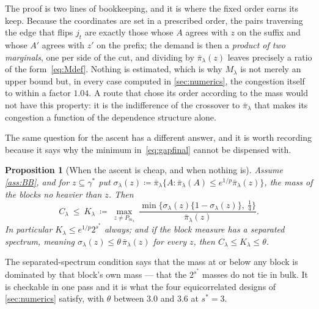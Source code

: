 \documentclass[aos]{imsart}
\theoremstyle{plain}
\newtheorem{proposition}{Proposition}[section]
\theoremstyle{definition}
\begin{document}
    The proof is two lines of bookkeeping, and it is where the fixed order
    earns its keep. Because the coordinates are set in a prescribed order,
    the pairs traversing the edge that flips $j_t$ are exactly those whose
    $A$ agrees with $z$ on the suffix and whose $A'$ agrees with $z'$ on the
    prefix; the demand is then a \emph{product of two marginals}, one per
    side of the cut, and dividing by $\bar\pi_\lambda(z)$ leaves precisely a
    ratio of the form~\eqref{eq:Mdef}. Nothing is estimated, which is why
    $M_\lambda$ is not merely an upper bound but, in every case computed in
    \cref{sec:numerics}, the congestion itself to within a factor $1.04$.
    A route that chose its order according to the mass would not have this
    property: it is the indifference of the crossover to
    $\bar\pi_\lambda$ that makes its congestion a function of the
    dependence structure alone.

    The same question for the ascent has a different answer, and it is worth
    recording because it says why the minimum in~\eqref{eq:gapfinal} cannot be
    dispensed with.

    \begin{proposition}[When the ascent is cheap, and when nothing is]
        \label{prop:Kbound}
        Assume \cref{ass:BB}, and for $z\subseteq\gamma^{\ast}$ put
        $\sigma_\lambda(z)\coloneq\bar\pi_\lambda\{A:\bar\pi_\lambda(A)\leq
        e^{1/p}\bar\pi_\lambda(z)\}$, the mass of the blocks no heavier than
        $z$. Then
        \begin{equation}
            \label{eq:Kbound}
            C_\lambda\ \leq\ K_\lambda\ \coloneq\
            \max_{z\neq P_{m_\lambda}}\
            \frac{\min\bigl\{\sigma_\lambda(z)
            \{1-\sigma_\lambda(z)\},\ \tfrac14\bigr\}}
            {\bar\pi_\lambda(z)} .
        \end{equation}
        In particular $K_\lambda\leq e^{1/p}2^{s^{\ast}}$ always; and if the
        block measure has a \emph{separated spectrum}, meaning
        $\sigma_\lambda(z)\leq\theta\,\bar\pi_\lambda(z)$ for every $z$,
        then $C_\lambda\leq K_\lambda\leq\theta$.
    \end{proposition}

    The separated-spectrum condition says that the mass at or below any
    block is dominated by that block's own mass --- that the $2^{s^{\ast}}$
    masses do not tie in bulk. It is checkable in one pass and it is what
    the four equicorrelated designs of \cref{sec:numerics} satisfy, with
    $\theta$ between $3.0$ and $3.6$ at $s^{\ast}=3$.
\end{document}
